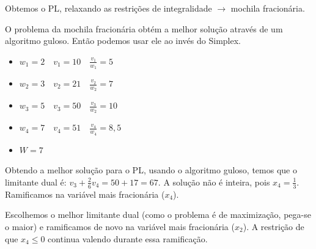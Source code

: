 Obtemos o PL, relaxando as restrições de integralidade $\to$ mochila fracionária.

O problema da mochila fracionária obtém a melhor solução através de um algoritmo guloso. Então podemos usar ele ao invés do Simplex.

\begin{example}
    \begin{itemize}
        \item $w_1=2\quad v_1=10\quad \frac{v_1}{w_1}=5$
        \item $w_2=3\quad v_2=21\quad \frac{v_2}{w_2}=7$
        \item $w_3=5\quad v_3=50\quad \frac{v_3}{w_2}=10$
        \item $w_4=7\quad v_4=51\quad \frac{v_4}{w_4}=8,5$
        \item $W = 7$
    \end{itemize}
\end{example}

Obtendo a melhor solução para o PL, usando o algoritmo guloso, temos que o limitante dual é: $v_3+\frac{2}{6}v_4=50+17=67$. A solução não é inteira, pois $x_4=\frac{1}{3}$. Ramificamos na variável mais fracionária ($x_4$).

\begin{example}
    \centering
\end{example}

Escolhemos o melhor limitante dual (como o problema é de maximização, pega-se o maior) e ramificamos de novo na variável mais fracionária ($x_2$). A restrição de que $x_4\leq 0$ continua valendo durante essa ramificação.

\begin{example}
    \centering
\end{example}

